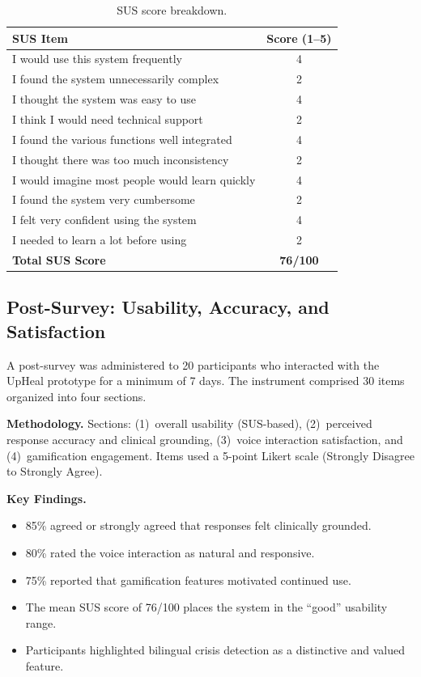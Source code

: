 \documentclass[12pt,a4paper,oneside,openany]{report}
\begin{document}
\begin{table}[H]
\centering\small
\caption{SUS score breakdown.}
\label{tab:sus}
\begin{tabular}{@{}lc@{}}
\toprule
SUS Item & Score (1--5) \\
\midrule
I would use this system frequently & 4 \\
I found the system unnecessarily complex & 2 \\
I thought the system was easy to use & 4 \\
I think I would need technical support & 2 \\
I found the various functions well integrated & 4 \\
I thought there was too much inconsistency & 2 \\
I would imagine most people would learn quickly & 4 \\
I found the system very cumbersome & 2 \\
I felt very confident using the system & 4 \\
I needed to learn a lot before using & 2 \\
\midrule
\textbf{Total SUS Score} & \textbf{76/100} \\
\bottomrule
\end{tabular}
\end{table}

\subsection{Post-Survey: Usability, Accuracy, and Satisfaction}

A post-survey was administered to 20 participants who interacted with the UpHeal prototype for a minimum of 7 days. The instrument comprised 30 items organized into four sections.

\textbf{Methodology.} Sections: (1)~overall usability (SUS-based), (2)~perceived response accuracy and clinical grounding, (3)~voice interaction satisfaction, and (4)~gamification engagement. Items used a 5-point Likert scale (Strongly Disagree to Strongly Agree).

\textbf{Key Findings.}
\begin{itemize}[nosep]
\item 85\% agreed or strongly agreed that responses felt clinically grounded.
\item 80\% rated the voice interaction as natural and responsive.
\item 75\% reported that gamification features motivated continued use.
\item The mean SUS score of 76/100 places the system in the ``good'' usability range.
\item Participants highlighted bilingual crisis detection as a distinctive and valued feature.
\end{itemize}
\end{document}
